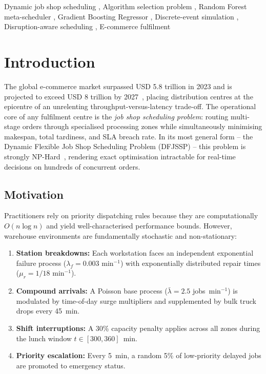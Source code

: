 \documentclass[3p,times]{elsarticle}
\begin{document}
\begin{frontmatter}
\begin{keyword}
Dynamic job shop scheduling \sep
Algorithm selection problem \sep
Random Forest meta-scheduler \sep
Gradient Boosting Regressor \sep
Discrete-event simulation \sep
Disruption-aware scheduling \sep
E-commerce fulfilment
\end{keyword}

\end{frontmatter}


\section{Introduction}
\label{sec:intro}

The global e-commerce market surpassed USD 5.8 trillion in 2023 and
is projected to exceed USD 8 trillion by 2027~\cite{Statista2024},
placing distribution centres at the epicentre of an unrelenting
throughput-versus-latency trade-off.  The operational core of any
fulfilment centre is the \textit{job shop scheduling problem}:
routing multi-stage orders through specialised processing zones
while simultaneously minimising makespan, total tardiness, and SLA
breach rate.  In its most general form -- the Dynamic Flexible Job
Shop Scheduling Problem (DFJSSP) -- this problem is strongly
NP-Hard~\cite{Garey1979}, rendering exact optimisation intractable
for real-time decisions on hundreds of concurrent orders.

\subsection{Motivation}
\label{sec:motivation}

Practitioners rely on priority dispatching rules because they
are computationally $O(n \log n)$ and yield well-characterised
performance bounds.  However, warehouse environments are
fundamentally stochastic and non-stationary:

\begin{enumerate}
  \item \textbf{Station breakdowns:} Each workstation faces an
    independent exponential failure process ($\lambda_f = 0.003$
    min$^{-1}$) with exponentially distributed repair times
    ($\mu_r = 1/18$ min$^{-1}$).
  \item \textbf{Compound arrivals:} A Poisson base process
    ($\bar\lambda = 2.5$ jobs~min$^{-1}$) is modulated by
    time-of-day surge multipliers and supplemented by bulk truck
    drops every 45~min.
  \item \textbf{Shift interruptions:} A 30\% capacity penalty
    applies across all zones during the lunch window
    $t \in [300, 360]$~min.
  \item \textbf{Priority escalation:} Every 5~min, a random 5\%
    of low-priority delayed jobs are promoted to emergency status.
\end{enumerate}
\end{document}
